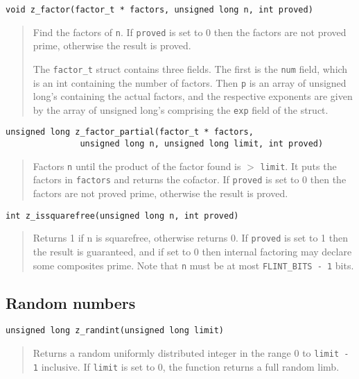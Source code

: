 \documentclass[a4paper,10pt]{article}
\newcommand{\code}{\lstinline}
\begin{document}
\begin{lstlisting}
void z_factor(factor_t * factors, unsigned long n, int proved)
\end{lstlisting}
\begin{quote}
Find the factors of \code{n}.  If \code{proved} is set to 0 then the factors are not proved prime, otherwise the result is proved.

The \code{factor_t} struct contains three fields. The first is the \code{num} field, which is an int containing the number of factors. Then \code{p} is an array of unsigned long's containing the actual factors, and the respective exponents are given by the array of unsigned long's comprising the \code{exp} field of the struct.
\end{quote}

\begin{lstlisting}
unsigned long z_factor_partial(factor_t * factors,
               unsigned long n, unsigned long limit, int proved)
\end{lstlisting}
\begin{quote}
Factors \code{n} until the product of the factor found is $>$ \code{limit}. It puts the factors in \code{factors} and returns the cofactor.  If \code{proved} is set to 0 then the factors are not proved prime, otherwise the result is proved.
\end{quote}

\begin{lstlisting}
int z_issquarefree(unsigned long n, int proved)
\end{lstlisting}
\begin{quote}
Returns 1 if n is squarefree, otherwise returns 0. If \code{proved} is set to 1 then the result is guaranteed, and if set to 0 then internal factoring may declare some composites prime. Note that \code{n} must be at most \code{FLINT_BITS - 1} bits.
\end{quote}

\subsection{Random numbers}

\begin{lstlisting}
unsigned long z_randint(unsigned long limit)
\end{lstlisting}
\begin{quote}
Returns a random uniformly distributed integer in the range 0 to \code{limit - 1} inclusive. If \code{limit} is set to 0, the function returns a full random limb.
\end{quote}
 
\end{document}
